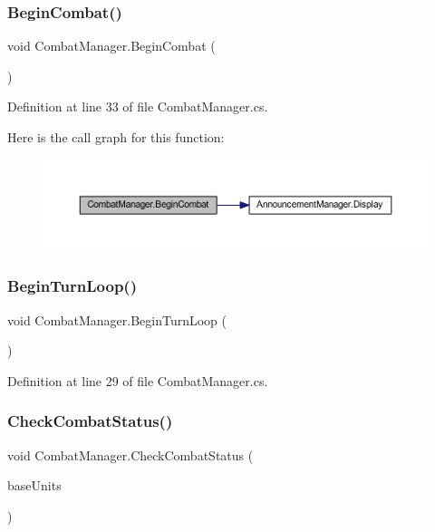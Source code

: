 \subsubsection{\texorpdfstring{BeginCombat()}{BeginCombat()}}
{\footnotesize\ttfamily void Combat\+Manager.\+Begin\+Combat (\begin{DoxyParamCaption}{ }\end{DoxyParamCaption})}



Definition at line 33 of file Combat\+Manager.\+cs.

Here is the call graph for this function\+:
\nopagebreak
\begin{figure}[H]
\begin{center}
\leavevmode
\includegraphics[width=350pt]{class_combat_manager_ab5d0c356fd55e86d62b03c015754abee_cgraph}
\end{center}
\end{figure}
\mbox{\label{class_combat_manager_aa31394843beacdbfd52d683a68a7f454}} 
\subsubsection{\texorpdfstring{BeginTurnLoop()}{BeginTurnLoop()}}
{\footnotesize\ttfamily void Combat\+Manager.\+Begin\+Turn\+Loop (\begin{DoxyParamCaption}{ }\end{DoxyParamCaption})}



Definition at line 29 of file Combat\+Manager.\+cs.

\mbox{\label{class_combat_manager_aea6dfda807c4ec793ed26c5d220b84fb}} 
\subsubsection{\texorpdfstring{CheckCombatStatus()}{CheckCombatStatus()}}
{\footnotesize\ttfamily void Combat\+Manager.\+Check\+Combat\+Status (\begin{DoxyParamCaption}\item[{List$<$ \mbox{\hyperlink{class_base_unit}{Base\+Unit}} $>$}]{base\+Units }\end{DoxyParamCaption})}



